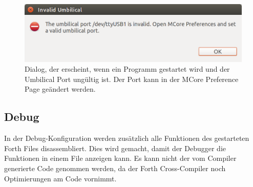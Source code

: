\begin{figure}[H]
	\centering
		\includegraphics[scale=0.4]{launch/invalidumbilical.png}
		\caption{Dialog, der erscheint, wenn ein Programm gestartet wird und der Umbilical Port ungültig ist. Der Port kann in der MCore Preference Page geändert werden.}
		\label{fig:invalidumbilical}
\end{figure}

\subsection{Debug}

In der Debug-Konfiguration werden zusätzlich alle Funktionen des gestarteten Forth Files disassembliert. Dies wird gemacht, damit der Debugger die Funktionen in einem File anzeigen kann. Es kann nicht der vom Compiler generierte Code genommen werden, da der Forth Cross-Compiler noch Optimierungen am Code vornimmt.


